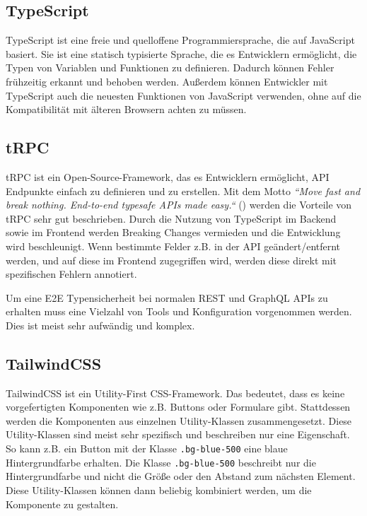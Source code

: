 \subsection{TypeScript}

TypeScript ist eine freie und quelloffene Programmiersprache, die auf JavaScript basiert. Sie ist eine statisch typisierte Sprache, die es Entwicklern ermöglicht, die Typen von Variablen und Funktionen zu definieren. Dadurch können Fehler frühzeitig erkannt und behoben werden. Außerdem können Entwickler mit TypeScript auch die neuesten Funktionen von JavaScript verwenden, ohne auf die Kompatibilität mit älteren Browsern achten zu müssen.

\subsection{tRPC}

tRPC ist ein Open-Source-Framework, das es Entwicklern ermöglicht, API Endpunkte einfach zu definieren und zu erstellen. Mit dem Motto \emph{``Move fast and break nothing. End-to-end typesafe APIs made easy.``} () werden die Vorteile von tRPC sehr gut beschrieben. Durch die Nutzung von TypeScript im Backend sowie im Frontend werden Breaking Changes vermieden und die Entwicklung wird beschleunigt. Wenn bestimmte Felder z.B. in der API geändert/entfernt werden, und auf diese im Frontend zugegriffen wird, werden diese direkt mit spezifischen Fehlern annotiert.

Um eine E2E Typensicherheit bei normalen REST und GraphQL APIs zu erhalten muss eine Vielzahl von Tools und Konfiguration vorgenommen werden. Dies ist meist sehr aufwändig und komplex.

\subsection{TailwindCSS}

TailwindCSS ist ein Utility-First CSS-Framework. Das bedeutet, dass es keine vorgefertigten Komponenten wie z.B. Buttons oder Formulare gibt. Stattdessen werden die Komponenten aus einzelnen Utility-Klassen zusammengesetzt. Diese Utility-Klassen sind meist sehr spezifisch und beschreiben nur eine Eigenschaft. So kann z.B. ein Button mit der Klasse \texttt{.bg-blue-500} eine blaue Hintergrundfarbe erhalten. Die Klasse \texttt{.bg-blue-500} beschreibt nur die Hintergrundfarbe und nicht die Größe oder den Abstand zum nächsten Element. Diese Utility-Klassen können dann beliebig kombiniert werden, um die Komponente zu gestalten.

